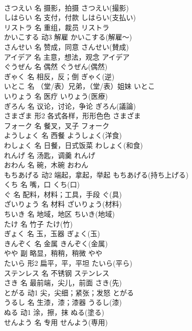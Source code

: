 \documentclass[8pt]{extreport}
\begin{document}
\begin{CJK}{UTF8}{min}
\\	さつえい	名	摄影，拍摄	さつえい(撮影)	
\\	しはらい	名	支付，付款	しはらい(支払い)	
\\	リストラ	名	重组，裁员	リストラ	
\\	かいこする	动3	解雇	かいこする(解雇～)	
\\	さんせい	名	赞成，同意	さんせい(賛成)	
\\	アイデア	名	主意，想法，观念	アイデア	
\\	ぐうぜん	名	偶然	ぐうぜん(偶然)	
\\	ぎゃく	名	相反，反；倒	ぎゃく(逆)	
\\	いとこ	名	（堂/表）兄弟，（堂/表）姐妹	いとこ	
\\	いりょう	名	医疗	いりょう(医療)	
\\	ぎろん	名	议论，讨论，争论	ぎろん(議論)	
\\	さまざま	形2	各式各样，形形色色	さまざま	
\\	フォーク	名	餐叉，叉子	フォーク	
\\	ようしょく	名	西餐	ようしょく(洋食)	
\\	わしょく	名	日餐，日式饭菜	わしょく(和食)	
\\	れんげ	名	汤匙，调羹	れんげ	
\\	おわん	名	碗，木碗	おわん	
\\	もちあげる	动2	端起，拿起，举起	もちあげる(持ち上げる)	
\\	くち	名	嘴，口	くち(口)	
\\	ぐ	名	配料，材料；工具，手段	ぐ(具)	
\\	ざいりょう	名	材料	ざいりょう(材料)	
\\	ちいき	名	地域，地区	ちいき(地域)	
\\	たけ	名	竹子	たけ(竹)	
\\	ぎょく	名	玉，玉器	ぎょく(玉)	
\\	きんぞく	名	金属	きんぞく(金属)	
\\	やや	副	略显，稍稍，稍微	やや	
\\	たいら	形2	扁平，平，平坦	たいら(平ら)	
\\	ステンレス	名	不锈钢	ステンレス	
\\	さき	名	最前端，尖儿，前面	さき(先)	
\\	とがる	动1	尖，尖细；紧张；发怒	とがる	
\\	うるし	名	生漆，漆；漆器	うるし(漆)	
\\	ぬる	动1	涂，擦，抹	ぬる(塗る)	
\\	せんよう	名	专用	せんよう(専用)	

\end{CJK}
\end{document}
